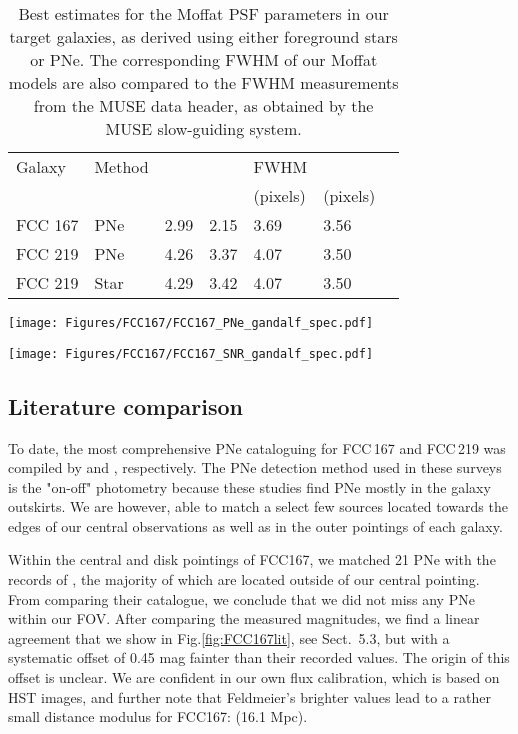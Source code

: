\documentclass{aa}
\newcommand{\placefigeightA}{
\begin{figure*}
    \texttt{[image: Figures/FCC167/FCC167\_PNe\_gandalf\_spec.pdf]}
    \caption{GandALF fit to the typical spectrum (green) of a PNe source (black line, top plot) from FCC\,167 (F3D J033627.08-345832.69), and its galaxy stellar background (red), showing strong [\ion{O}{iii}] lines and some  emission. The middle plot shows the emission lines as detected by GandALF (blue). The dashed horizontal line indicates the level of residual noise (standard deviation of the residuals from stellar subtraction (black points)). The lower left panel zooms into the H and [\ion{O}{iii}] doublet wavelength region, and the lower right panel shows the region occupied by  and the [\ion{N}{ii}] and [\ion{S}{ii}] doublets. The data, best fit, and stellar spectra shown in the bottom two plots are subtracted by an arbitrary number to better present and compare the fit of the nebulous and stellar emissions within each region.}
    \label{fig:gandalf_PNe}
\end{figure*}
}
\newcommand{\placefigeightB}{
\begin{figure*}
    \texttt{[image: Figures/FCC167/FCC167\_SNR\_gandalf\_spec.pdf]}
    \caption{Same as Fig~\ref{fig:gandalf_PNe}, for a potential supernova remnant source within FCC\,167 (F3D J033627.66-345844.20). The detected , [\ion{N}{ii}] and [\ion{S}{ii}] emission is similar to that of [\ion{O}{iii}].}
    \label{fig:gandalf_SNR}
\end{figure*}
}
\begin{document}
\begin{table}
    \renewcommand{\arraystretch}{1.2}
    \caption{Best estimates for the Moffat PSF parameters in our target galaxies, as derived using either foreground stars or PNe. The corresponding FWHM of our Moffat models are also compared to the FWHM measurements from the MUSE data header, as obtained by the MUSE slow-guiding system.} \label{tab:PSF}
    \begin{tabular}{l l l l l l l}
    \hline
    Galaxy & Method &  &  & FWHM & \\
    & & & & (pixels) & (pixels) \\
    \hline 
    FCC 167 & PNe  & 2.99 & 2.15 & 3.69 & 3.56 \\
    FCC 219 & PNe  & 4.26 & 3.37 & 4.07 & 3.50 \\
    FCC 219 & Star & 4.29 & 3.42 & 4.07 & 3.50 \\
    \hline
    \end{tabular}
    
\end{table}


\placefigeightA
\placefigeightB


\subsection{Literature comparison}
To date, the most comprehensive PNe cataloguing for FCC\,167 and FCC\,219 was compiled by \citet{feldmeier_calibrating_2007} and \cite{mcmillan_planetary_1993}, respectively. The PNe detection method used in these surveys is the "on-off" photometry because these studies find PNe mostly in the galaxy outskirts. We are however, able to match a select few sources located towards the edges of our central observations as well as in the outer pointings of each galaxy.

Within the central and disk pointings of FCC167, we matched 21 PNe with the records of \citet{feldmeier_calibrating_2007}, the majority of which are located outside of our central pointing. From comparing their catalogue, we conclude that we did not miss any PNe within our FOV. After comparing the measured magnitudes, we find a linear agreement that we show in Fig.\ref{fig:FCC167lit}, see Sect.~5.3, but with a systematic offset of 0.45 mag fainter than their recorded values. The origin of this offset is unclear. We are confident in our own flux calibration, which is based on HST images, and further note that Feldmeier's brighter  values lead to a rather small distance modulus for FCC167:  (16.1 Mpc).
\end{document}
